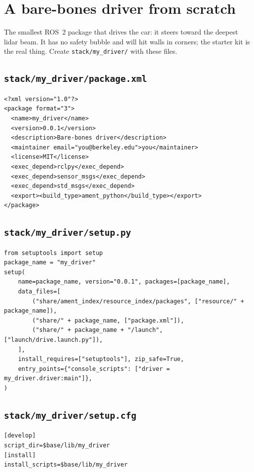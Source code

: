 \documentclass[11pt,a4paper]{article}
\begin{document}
\section{A bare-bones driver from scratch}

The smallest ROS~2 package that drives the car: it steers toward the deepest lidar beam.
It has no safety bubble and will hit walls in corners; the starter kit is the real thing.
Create \texttt{stack/my\_driver/} with these files.

\subsection*{\texttt{stack/my\_driver/package.xml}}
\begin{lstlisting}
<?xml version="1.0"?>
<package format="3">
  <name>my_driver</name>
  <version>0.0.1</version>
  <description>Bare-bones driver</description>
  <maintainer email="you@berkeley.edu">you</maintainer>
  <license>MIT</license>
  <exec_depend>rclpy</exec_depend>
  <exec_depend>sensor_msgs</exec_depend>
  <exec_depend>std_msgs</exec_depend>
  <export><build_type>ament_python</build_type></export>
</package>
\end{lstlisting}

\subsection*{\texttt{stack/my\_driver/setup.py}}
\begin{lstlisting}
from setuptools import setup
package_name = "my_driver"
setup(
    name=package_name, version="0.0.1", packages=[package_name],
    data_files=[
        ("share/ament_index/resource_index/packages", ["resource/" + package_name]),
        ("share/" + package_name, ["package.xml"]),
        ("share/" + package_name + "/launch", ["launch/drive.launch.py"]),
    ],
    install_requires=["setuptools"], zip_safe=True,
    entry_points={"console_scripts": ["driver = my_driver.driver:main"]},
)
\end{lstlisting}

\subsection*{\texttt{stack/my\_driver/setup.cfg}}
\begin{lstlisting}
[develop]
script_dir=$base/lib/my_driver
[install]
install_scripts=$base/lib/my_driver
\end{lstlisting}
\end{document}
